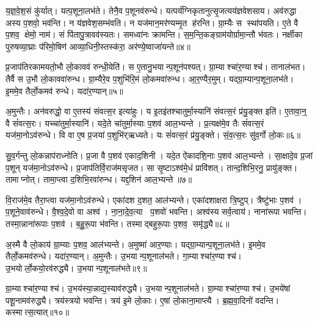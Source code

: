 य॒ज्ञ॒वे॒श॒सं कु॑र्यात्।
यत्प॒शूना॒लभ॑ते।
तेनै॒व प॒शूनव॑रुन्धे।
यत्पर्य॑ग्निकृतानुत्सृ॒जत्यय॑ज्ञवेशसाय।
अव॑रुद्धा अस्य प॒शवो॒ भव॑न्ति।
न य॑ज्ञवेश॒सम्भ॑वति।
न यज॑मान॒मर॑ण्यम्मृ॒त ह॑रन्ति।
ग्रा॒म्यैः स स्था॑पयति।
ए॒ते वै प॒शव॒ क्षेमो॒ नाम॑।
सं पि॑तापु॒त्रावव॑स्यतः।
समध्वा॑नः क्रामन्ति।
स॒म॒न्ति॒कङ्ग्राम॑योर्ग्रामा॒न्तौ भ॑वतः।
नर्क्षीका पुरुषव्या॒घ्राः प॑रिमो॒षिण॑ आव्या॒धिनी॒स्तस्क॑रा॒ अर॑ण्ये॒ष्वाजा॑यन्ते॥४॥\anuvakamend[ऋ॒तव॑ स्यातामुत्सृ॒जेत्स्य॑त॒स्त्रीणि॑ च]

प्र॒जाप॑तिरकामयतो॒भौ लो॒कावव॑ रुन्धी॒येति॑।
स ए॒तानु॒भयान्प॒शून॑पश्यत्।
ग्रा॒म्याश्चा॑र॒ण्याश्च॑।
तानाल॑भत।
तैर्वै स उ॒भौ लो॒काववा॑रुन्ध।
ग्रा॒म्यैरे॒व प॒शुभि॑रि॒मं लो॒कमवा॑रुन्ध।
आ॒र॒ण्यैर॒मुम्।
यद्ग्रा॒म्यान्प॒शूना॒लभ॑ते।
इ॒ममे॒व तैर्लो॒कमव॑ रुन्धे।
यदा॑र॒ण्यान्॥५॥

अ॒मुन्तैः।
अन॑वरुद्धो॒ वा ए॒तस्य॑ संवत्स॒र इत्या॑हुः।
य इ॒तइ॑तश्चातुर्मा॒स्यानि॑ संवत्स॒रं प्र॑यु॒ङ्क्त इति॑।
ए॒तावा॒न्॒ वै सं॑वत्स॒रः।
यच्चा॑तुर्मा॒स्यानि॑।
यदे॒ते चा॑तुर्मा॒स्याः प॒शव॑ आल॒भ्यन्ते।
प्र॒त्यक्ष॑मे॒व तैः सं॑वत्स॒रं यज॑मा॒नोऽव॑रुन्धे।
वि वा ए॒ष प्र॒जया॑ प॒शुभि॑र्‌ऋध्यते।
यः सं॑वत्स॒रं प्र॑यु॒ङ्क्ते।
सं॒व॒त्स॒रः सु॑व॒र्गो लो॒कः॥६॥

सु॒व॒र्गन्तु लो॒कन्नाप॑राध्नोति।
प्र॒जा वै प॒शव॑ एकाद॒शिनी।
यदे॒त ऐ॑कादशि॒नाः प॒शव॑ आल॒भ्यन्ते।
सा॒क्षादे॒व प्र॒जां प॒शून् यज॑मा॒नोऽव॑रुन्धे।
प्र॒जाप॑तिर्वि॒राज॑मसृजत।
सा सृ॒ष्टाऽश्व॑मे॒धं प्रावि॑शत्।
तान्द॒शिभि॒रनु॒ प्रायु॑ङ्क्त।
तामाप्नोत्।
तामा॒प्त्वा द॒शिभि॒रवा॑रुन्ध।
यद्द॒शिन॑ आल॒भ्यन्ते॥७॥

वि॒राज॑मे॒व तैरा॒प्त्वा यज॑मा॒नोऽव॑रुन्धे।
एका॑दश द॒शत॒ आल॑भ्यन्ते।
एका॑दशाक्षरा त्रि॒ष्टुप्।
त्रैष्टु॑भाः प॒शव॑।
प॒शूने॒वाव॑रुन्धे।
वै॒श्व॒दे॒वो वा अश्व॑।
ना॒ना॒दे॒व॒त्या प॒शवो॑ भवन्ति।
अश्व॑स्य सर्व॒त्वाय॑।
नाना॑रूपा भवन्ति।
तस्मा॒न्नाना॑रूपाः प॒शव॑।
ब॒हु॒रू॒पा भ॑वन्ति।
तस्माद्बहुरू॒पाः प॒शव॒ समृ॑द्ध्यै॥८॥\anuvakamend[आ॒र॒ण्याल्लोँ॒को द॒शिन॑ आल॒भ्यन्ते॒ नाना॑रूपाः प॒शवो॒ द्वे च॑]

अ॒स्मै वै लो॒काय॑ ग्रा॒म्याः प॒शव॒ आल॑भ्यन्ते।
अ॒मुष्मा॑ आर॒ण्याः।
यद्ग्रा॒म्यान्प॒शूना॒लभ॑ते।
इ॒ममे॒व तैर्लो॒कमव॑रुन्धे।
यदा॑र॒ण्यान्।
अ॒मुन्तैः।
उ॒भयान्प॒शूनाल॑भते।
गा॒म्याश्चा॑र॒ण्याश्च॑।
उ॒भयोर्लो॒कयो॒रव॑रुद्ध्यै।
उ॒भयान्प॒शूनाल॑भते॥९॥

ग्रा॒म्याश्चा॑र॒ण्याश्च॑।
उ॒भय॑स्या॒न्नाद्य॒स्याव॑रुद्ध्यै।
उ॒भयान्प॒शूनाल॑भते।
ग्रा॒म्याश्चा॑र॒ण्याश्च॑।
उ॒भये॑षां पशू॒नामव॑रुद्ध्यै।
त्रय॑स्त्रयो भवन्ति।
त्रय॑ इ॒मे लो॒काः।
ए॒षां लो॒काना॒माप्त्यै।
ब्र॒ह्म॒वा॒दिनो॑ वदन्ति।
कस्मात्स॒त्यात्॥१०॥

